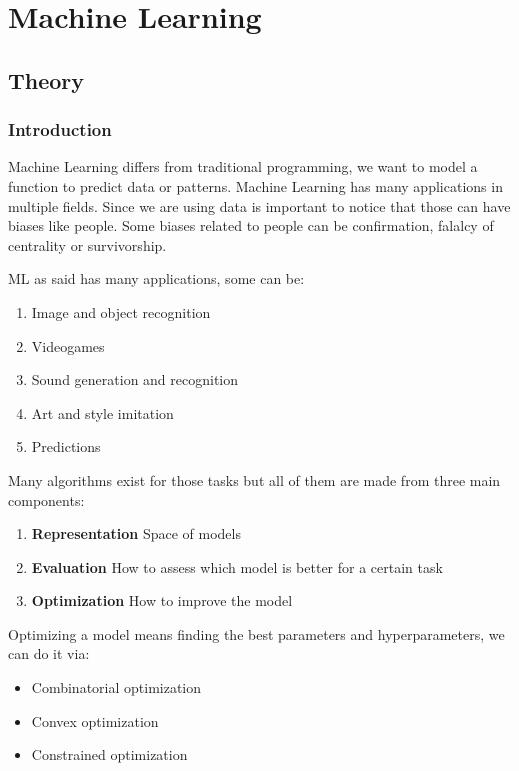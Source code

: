 \section{Machine Learning}
\subsection{Theory}

\subsubsection{Introduction}

Machine Learning differs from traditional programming, we want to model a function to predict data or patterns. Machine Learning has many applications in multiple fields. Since we are using data is important to notice that those can have biases like people. Some biases related to people can be confirmation, falalcy of centrality or survivorship.

\vspace{10pt}

ML as said has many applications, some can be:
\begin{enumerate}
    \item Image and object recognition
    \item Videogames
    \item Sound generation and recognition
    \item Art and style imitation
    \item Predictions
\end{enumerate}

\vspace{10pt}

Many algorithms exist for those tasks but all of them are made from three main components:
\begin{enumerate}
    \item \textbf{Representation} \ra Space of models
    \item \textbf{Evaluation} \ra How to assess which model is better for a certain task
    \item \textbf{Optimization} \ra How to improve the model
\end{enumerate}

Optimizing a model means finding the best parameters and hyperparameters, we can do it via:
\begin{itemize}
    \item Combinatorial optimization
    \item Convex optimization
    \item Constrained optimization
\end{itemize}

